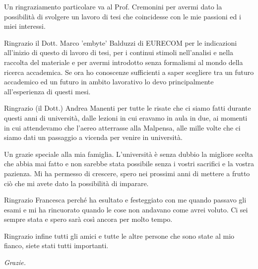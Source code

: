 Un ringraziamento particolare va al Prof. Cremonini per avermi dato la possibilità di svolgere un lavoro di tesi che coincidesse con le mie passioni ed i miei interessi.

Ringrazio il Dott. Marco 'embyte' Balduzzi di EURECOM per le indicazioni all'inizio di questo di lavoro di tesi, per i continui stimoli nell'analisi e nella raccolta del materiale e per avermi introdotto senza formalismi al mondo della ricerca accademica. Se ora ho conoscenze sufficienti a saper scegliere tra un futuro accademico ed un futuro in ambito lavorativo lo devo principalmente all'esperienza di questi mesi.

Ringrazio (il Dott.) Andrea Manenti per tutte le risate che ci siamo fatti durante questi anni di università, dalle lezioni in cui eravamo in aula in due, ai momenti in cui attendevamo che l'aereo atterrasse alla Malpensa, alle mille volte che ci siamo dati un passaggio a vicenda per venire in università.

Un grazie speciale alla mia famiglia. L'università è senza dubbio la migliore scelta che abbia mai fatto e non sarebbe stata possibile senza i vostri sacrifici e la vostra pazienza. Mi ha permesso di crescere, spero nei prossimi anni di mettere a frutto ciò che mi avete dato la possibilità di imparare.

Ringrazio Francesca perché ha esultato e festeggiato con me quando passavo gli esami e mi ha rincuorato quando le cose non andavano come avrei voluto. Ci sei sempre stata e spero sarà così ancora per molto tempo.

Ringrazio infine tutti gli amici e tutte le altre persone che sono state al mio fianco, siete stati tutti importanti.

\emph{Grazie.}